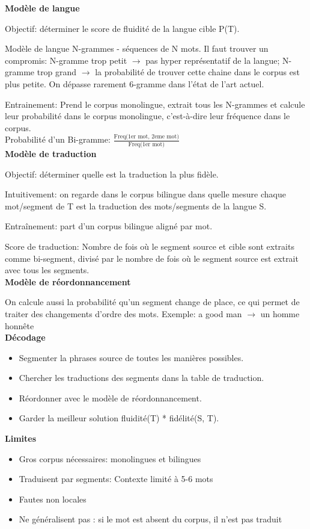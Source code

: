 \textbf{Modèle de langue}

Objectif: déterminer le score de fluidité de la langue cible P(T).

Modèle de langue N-grammes - séquences de N mots. Il faut trouver un compromis: N-gramme trop petit $\rightarrow$ pas hyper représentatif de la langue; N-gramme trop grand $\rightarrow$ la probabilité de trouver cette chaine dans le corpus est plus petite. On dépasse rarement 6-gramme dans l'état de l'art actuel.

Entrainement: Prend le corpus monolingue, extrait tous les N-grammes et calcule leur probabilité dans le corpus monolingue, c'est-à-dire leur fréquence dans le corpus. \\

Probabilité d'un Bi-gramme: $ \frac{ \text{Freq(1er mot, 2eme mot)}}{\text{Freq(1er mot)}} $ \\

\textbf{Modèle de traduction}

Objectif: déterminer quelle est la traduction la plus fidèle.

Intuitivement: on regarde dans le corpus bilingue dans quelle mesure chaque mot/segment de T est la traduction des mots/segments de la langue S.

Entraînement: part d'un corpus bilingue aligné par mot.

Score de traduction: Nombre de fois où le segment source et cible sont extraits comme bi-segment, divisé par le nombre de fois où le segment source est extrait avec tous les segments.\\

\textbf{Modèle de réordonnancement}

On calcule aussi la probabilité qu'un segment change de place, ce qui permet de traiter des changements d'ordre des mots. Exemple: a good man $\rightarrow$ un homme honnête\\

\textbf{Décodage}

\begin{itemize}
    \item Segmenter la phrases source de toutes les manières possibles.
    \item Chercher les traductions des segments dans la table de traduction.
    \item Réordonner avec le modèle de réordonnancement.
    \item Garder la meilleur solution fluidité(T) * fidélité(S, T).
\end{itemize}


\textbf{Limites}

\begin{itemize}
    \item Gros corpus nécessaires: monolingues et bilingues
    \item Traduisent par segments: Contexte limité à 5-6 mots
    \item Fautes non locales
    \item Ne généralisent pas : si le mot est absent du corpus, il n'est pas traduit\\
\end{itemize}





